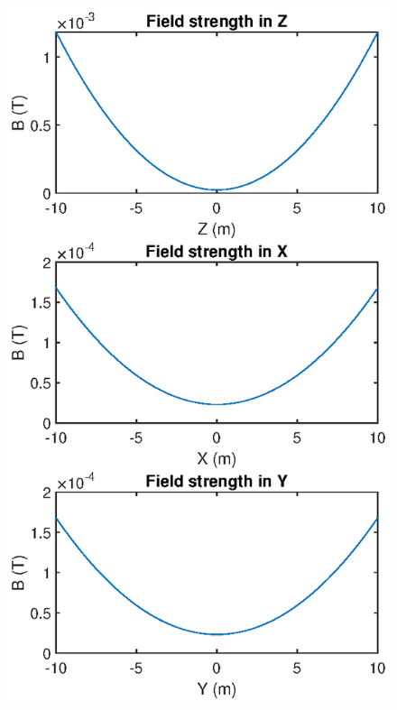 \documentclass{article}
\theoremstyle{definition}
\begin{document}
\begin{figure}[!htb]
\begin{minipage}{.49\textwidth}
	\end{minipage}%
	\begin{minipage}{.49\textwidth}
		\centering
		\includegraphics[width=\linewidth]{sim-figs/TOP-2.eps}
	\end{minipage}%
\end{figure}
\end{document}
